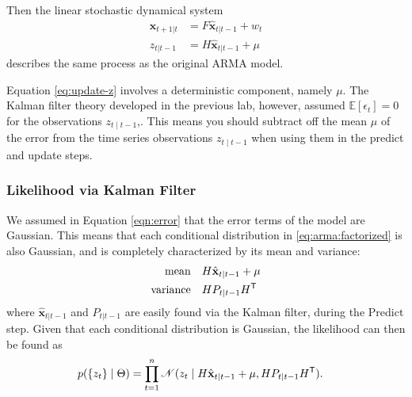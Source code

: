Then the linear stochastic
dynamical system
\begin{align}
    \hat{\textbf{x}}_{t+1|t} &= F\hat{\textbf{x}}_{t|t-1} + w_t\\
    z_{t|t-1} &= H\hat{\textbf{x}}_{t|t-1} + \mu
    \label{eq:update-z}
\end{align}
describes the same process as the original $\text{ARMA}$ model.

\begin{info}
Equation \ref{eq:update-z} involves a deterministic component, namely $\mu$.
The Kalman filter theory developed in the previous lab, however, assumed $\mathbb{E}[\epsilon_t]=0$ for the observations $z_{t\mid t-1}$,.
This means you should subtract off the mean
$\mu$ of the error from the time series observations $z_{t\mid t-1}$ when using them in the predict and update
steps.
\end{info}

\subsubsection*{Likelihood via Kalman Filter}

We assumed in Equation \ref{eqn:error} that the error terms of the model are Gaussian.
This means that each conditional distribution in \ref{eq:arma:factorized} is also Gaussian, and is completely characterized by its mean and variance:
\begin{align}
    \label{eq:mean:variance1}
    \text{mean} & \quad H\hat{\textbf{x}}_{t|t-1} + \mu \\
    \label{eq:mean:variance2}
    \text{variance} & \quad HP_{t|t-1}H^{\mathsf T}
\end{align}
where $\hat{\textbf{x}}_{t|t-1}$ and $P_{t|t-1}$ are easily found via the Kalman filter, during the Predict step.
Given that each conditional distribution is Gaussian, the likelihood can then be found as
\begin{align}
    \label{eq:arma:likelihood}
    p(\{z_t\} \mid \Theta)& = \prod_{t=1}^{n} \mathscr{N}(z_t\mid H\hat{\textbf{x}}_{t|t-1} + \mu, HP_{t|t-1}H^{\mathsf T} ).
\end{align}

